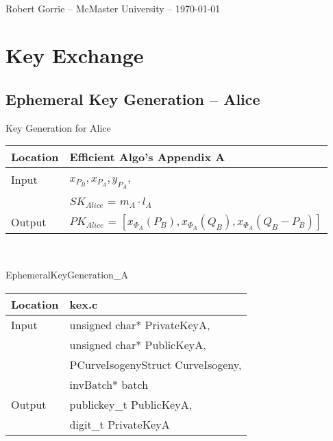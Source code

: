 \documentclass[10pt]{article}
\begin{document}
\begin{center}
\large {}\\
\normalsize {Robert Gorrie -- McMaster University -- \today}\\
\end{center}
\hline
{}


\section{Key Exchange}

\subsection{Ephemeral Key Generation -- Alice}
\begin{center}
Key Generation for Alice
\end{center}
\begin{center}
\begin{tabular}{@{}ll@{}}
	\toprule
	Location & Efficient Algo's Appendix A \\
	\midrule
	Input & $x_{P_{B}}, x_{P_{A}}, y_{P_{A}}$,\\
	& $SK_{Alice}$ = $m_{A} \cdot l_{A}$\\
	\midrule
	Output & $PK_{Alice}$ = $[x_{\Phi_{A}}(P_{B}), x_{\Phi_{A}}(Q_{B}), x_{\Phi_{A}}(Q_{B} - P_{B})]$\\
	\bottomrule
\end{tabular}
\end{center}

\\

\begin{center}
EphemeralKeyGeneration\_A
\end{center}
\begin{center}
\begin{tabular}{@{}ll@{}}
	\toprule
	Location & kex.c \\
	\midrule
	Input & unsigned char* PrivateKeyA,\\
	& unsigned char* PublicKeyA,\\
	& PCurveIsogenyStruct CurveIsogeny,\\
	& invBatch* batch\\
	\midrule
	Output & publickey\_t PublicKeyA,\\
	& digit\_t PrivateKeyA\\
	\bottomrule
\end{tabular}
\end{center}
\end{document}
